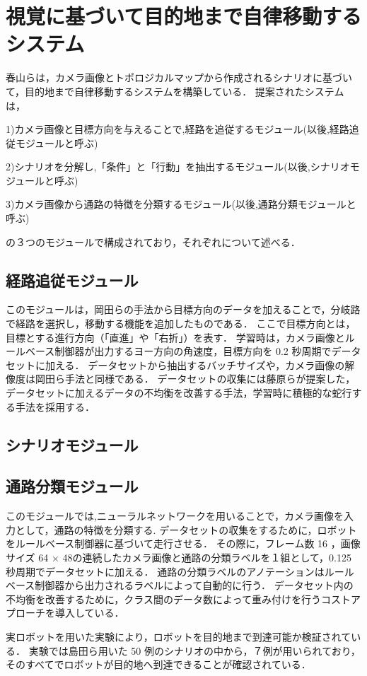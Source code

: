 \section{視覚に基づいて目的地まで自律移動するシステム}
春山らは，カメラ画像とトポロジカルマップから作成されるシナリオに基づいて，目的地まで自律移動するシステムを構築している．
提案されたシステムは，

1)カメラ画像と目標方向を与えることで,経路を追従するモジュール(以後,経路追従モジュールと呼ぶ)

2)シナリオを分解し,「条件」と「行動」を抽出するモジュール(以後,シナリオモジュールと呼ぶ)

3)カメラ画像から通路の特徴を分類するモジュール(以後,通路分類モジュールと呼ぶ)

の３つのモジュールで構成されており，それぞれについて述べる．
\subsection{経路追従モジュール}
このモジュールは，岡田らの手法から目標方向のデータを加えることで，分岐路で経路を選択し，移動する機能を追加したものである．
ここで目標方向とは，目標とする進行方向（「直進」や「右折」）を表す．
学習時は，カメラ画像とルールベース制御器が出力するヨー方向の角速度，目標方向を 0.2 秒周期でデータセットに加える．
データセットから抽出するバッチサイズや，カメラ画像の解像度は岡田ら手法と同様である．
データセットの収集には藤原らが提案した，データセットに加えるデータの不均衡を改善する手法，学習時に積極的な蛇行する手法を採用する．
\subsection{シナリオモジュール}
\subsection{通路分類モジュール}
このモジュールでは,ニューラルネットワークを用いることで，カメラ画像を入力として，通路の特徴を分類する.
データセットの収集をするために，ロボットをルールベース制御器に基づいて走行させる．
その際に，フレーム数 16 ，画像サイズ 64 × 48の連続したカメラ画像と通路の分類ラベルを１組として，0.125 秒周期でデータセットに加える．
通路の分類ラベルのアノテーションはルールベース制御器から出力されるラベルによって自動的に行う．
データセット内の不均衡を改善するために，クラス間のデータ数によって重み付けを行うコストアプローチを導入している．

実ロボットを用いた実験により，ロボットを目的地まで到達可能か検証されている．
実験では島田ら用いた 50 例のシナリオの中から，７例が用いられており，そのすべてでロボットが目的地へ到達できることが確認されている．